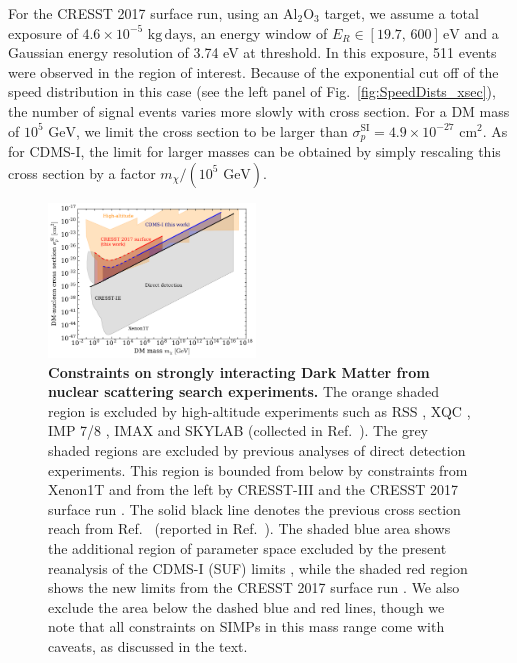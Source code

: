 \documentclass[prd,twocolumn,showpacs,nofootinbib,aps]{revtex4-1}
\begin{document}
For the CRESST 2017 surface run, using an $\mathrm{Al}_2\mathrm{O}_3$ target, we assume a total exposure of $4.6 \times 10^{-5}\,\,\mathrm{kg} \,\mathrm{days}$, an energy window of $E_R \in [19.7, \, 600] \,\mathrm{eV}$ and a Gaussian energy resolution of 3.74 eV at threshold. In this exposure, 511 events were observed in the region of interest. Because of the exponential cut off of the speed distribution in this case (see the left panel of Fig.~\ref{fig:SpeedDists_xsec}), the number of signal events varies more slowly with cross section. For a DM mass of $10^5 \,\,\mathrm{GeV}$, we limit the cross section to be larger than $\sigma_p^\mathrm{SI} = 4.9 \times 10^{-27}\,\,\mathrm{cm}^2$. As for CDMS-I, the limit for larger masses can be obtained by simply rescaling this cross section by a factor $m_\chi/(10^5\,\,\mathrm{GeV})$.


\begin{figure}[t]
\centering
\includegraphics[width=0.49\textwidth,]{plots/Constraints1.pdf}
\caption{\textbf{Constraints on strongly interacting Dark Matter from nuclear scattering search experiments.} The orange shaded region is excluded by high-altitude experiments such as RSS \cite{Rich1987}, XQC \cite{Zaharijas:2004jv,Erickcek:2007jv}, IMP 7/8 \cite{SnowdenIfft1990}, IMAX \cite{McGuire:1994pq} and SKYLAB \cite{Shirk1978} (collected in Ref.~\cite{Mack:2007xj}). The grey shaded regions are excluded by previous analyses of direct detection experiments. This region is bounded from below by constraints from Xenon1T \cite{Aprile:2017iyp} and from the left by CRESST-III \cite{Petricca:2017zdp} and the CRESST 2017 surface run \cite{Angloher:2017sxg,Davis:2017noy}. The solid black line denotes the previous cross section reach from Ref.~\cite{Albuquerque:2003ei} (reported in Ref.~\cite{Mack:2007xj}). The shaded blue area shows the additional region of parameter space excluded by the present reanalysis of the CDMS-I (SUF) limits \cite{Abusaidi:2000wg,Abrams:2002nb}, while the shaded red region shows the new limits from the CRESST 2017 surface run \cite{Angloher:2017sxg}. We also exclude the area below the dashed blue and red lines, though we note that all constraints on SIMPs in this mass range come with caveats, as discussed in the text.}
\label{fig:constraints}
\end{figure}
\end{document}
